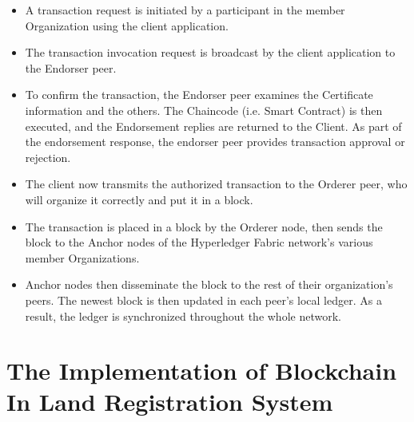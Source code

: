 \documentclass[12pt]{ucthesis}
\begin{document}
\begin{itemize}
    
\item  A transaction request is initiated by a participant in the member Organization using the client application.

\item The transaction invocation request is broadcast by the client application to the Endorser peer.

\item To confirm the transaction, the Endorser peer examines the Certificate information and the others. The Chaincode (i.e. Smart Contract) is then executed, and the Endorsement replies are returned to the Client. As part of the endorsement response, the endorser peer provides transaction approval or rejection.

\item The client now transmits the authorized transaction to the Orderer peer, who will organize it correctly and put it in a block.

\item The transaction is placed in a block by the Orderer node, then sends the block to the Anchor nodes of the Hyperledger Fabric network's various member Organizations.

\item Anchor nodes then disseminate the block to the rest of their organization's peers. The newest block is then updated in each peer's local ledger. As a result, the ledger is synchronized throughout the whole network. \end{itemize}

\section{The Implementation of Blockchain In
Land Registration System}
\end{document}
